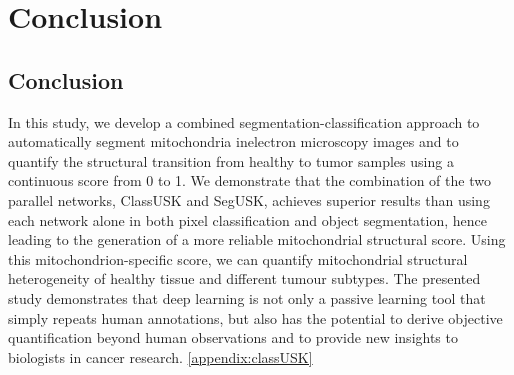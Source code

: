 	
\chapter{Conclusion}\label{chapter:conclusion}

\section{Conclusion}	
In this study, we develop a combined segmentation-classification approach to
automatically segment mitochondria inelectron microscopy images and to quantify
the structural transition from healthy to tumor samples using a continuous score from
0 to 1. We demonstrate that the combination of the two parallel networks, ClassUSK
and SegUSK, achieves superior results than using each network alone in both pixel
classification and object segmentation, hence leading to the generation of a more
reliable mitochondrial structural score. Using this mitochondrion-specific score, we
can quantify mitochondrial structural heterogeneity of healthy tissue and different
tumour subtypes. The presented study demonstrates that deep learning is not only a
passive learning tool that simply repeats human annotations, but also has the potential
to derive objective quantification beyond human observations and to provide new
insights to biologists in cancer research. \ref{appendix:classUSK}




